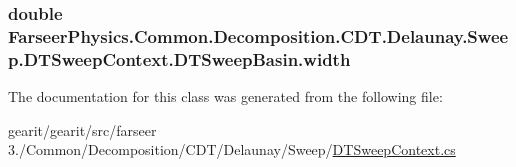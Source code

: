 \hypertarget{class_farseer_physics_1_1_common_1_1_decomposition_1_1_c_d_t_1_1_delaunay_1_1_sweep_1_1_d_t_sweep_context_1_1_d_t_sweep_basin_a7d45ba0a41d4abcad2ae1b79b403148e}{
\subsubsection[{width}]{\setlength{\rightskip}{0pt plus 5cm}double Farseer\+Physics.\+Common.\+Decomposition.\+C\+D\+T.\+Delaunay.\+Sweep.\+D\+T\+Sweep\+Context.\+D\+T\+Sweep\+Basin.\+width}}\label{class_farseer_physics_1_1_common_1_1_decomposition_1_1_c_d_t_1_1_delaunay_1_1_sweep_1_1_d_t_sweep_context_1_1_d_t_sweep_basin_a7d45ba0a41d4abcad2ae1b79b403148e}


The documentation for this class was generated from the following file\+:\begin{DoxyCompactItemize}
\item 
gearit/gearit/src/farseer 3./\+Common/\+Decomposition/\+C\+D\+T/\+Delaunay/\+Sweep/\hyperlink{_d_t_sweep_context_8cs}{D\+T\+Sweep\+Context.\+cs}\end{DoxyCompactItemize}
